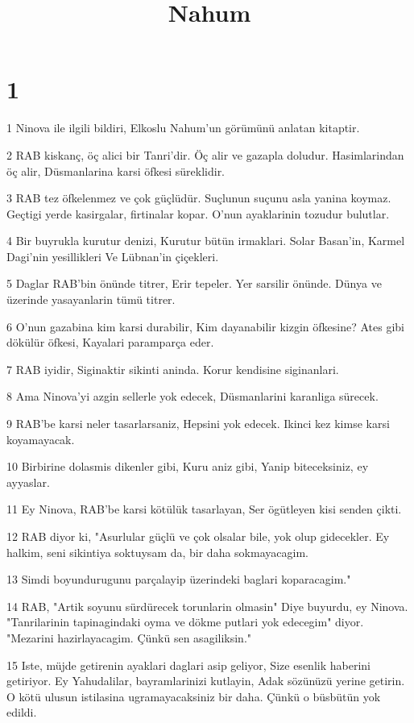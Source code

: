 

\title{Nahum}


\chapter{1}

\par 1 Ninova ile ilgili bildiri, Elkoslu Nahum'un görümünü anlatan kitaptir.
\par 2 RAB kiskanç, öç alici bir Tanri'dir. Öç alir ve gazapla doludur. Hasimlarindan öç alir, Düsmanlarina karsi öfkesi süreklidir.
\par 3 RAB tez öfkelenmez ve çok güçlüdür. Suçlunun suçunu asla yanina koymaz. Geçtigi yerde kasirgalar, firtinalar kopar. O'nun ayaklarinin tozudur bulutlar.
\par 4 Bir buyrukla kurutur denizi, Kurutur bütün irmaklari. Solar Basan'in, Karmel Dagi'nin yesillikleri Ve Lübnan'in çiçekleri.
\par 5 Daglar RAB'bin önünde titrer, Erir tepeler. Yer sarsilir önünde. Dünya ve üzerinde yasayanlarin tümü titrer.
\par 6 O'nun gazabina kim karsi durabilir, Kim dayanabilir kizgin öfkesine? Ates gibi dökülür öfkesi, Kayalari paramparça eder.
\par 7 RAB iyidir, Siginaktir sikinti aninda. Korur kendisine siginanlari.
\par 8 Ama Ninova'yi azgin sellerle yok edecek, Düsmanlarini karanliga sürecek.
\par 9 RAB'be karsi neler tasarlarsaniz, Hepsini yok edecek. Ikinci kez kimse karsi koyamayacak.
\par 10 Birbirine dolasmis dikenler gibi, Kuru aniz gibi, Yanip biteceksiniz, ey ayyaslar.
\par 11 Ey Ninova, RAB'be karsi kötülük tasarlayan, Ser ögütleyen kisi senden çikti.
\par 12 RAB diyor ki, "Asurlular güçlü ve çok olsalar bile, yok olup gidecekler. Ey halkim, seni sikintiya soktuysam da, bir daha sokmayacagim.
\par 13 Simdi boyundurugunu parçalayip üzerindeki baglari koparacagim."
\par 14 RAB, "Artik soyunu sürdürecek torunlarin olmasin" Diye buyurdu, ey Ninova. "Tanrilarinin tapinagindaki oyma ve dökme putlari yok edecegim" diyor. "Mezarini hazirlayacagim. Çünkü sen asagiliksin."
\par 15 Iste, müjde getirenin ayaklari daglari asip geliyor, Size esenlik haberini getiriyor. Ey Yahudalilar, bayramlarinizi kutlayin, Adak sözünüzü yerine getirin. O kötü ulusun istilasina ugramayacaksiniz bir daha. Çünkü o büsbütün yok edildi.


